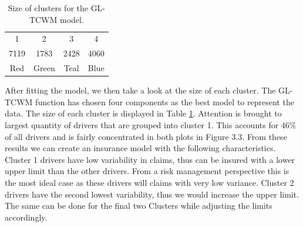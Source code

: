 \documentclass[11pt,letterpaper]{article}
\numberwithin{equation}{section}
\numberwithin{equation}{section}
\numberwithin{equation}{section}
\begin{document}
\begin{table}[!htb]
\centering
\caption{Size of clusters for the GL-TCWM model.}
\label{table:sizeSev}
\begin{tabular}{cccc}
\hline\hline
1   & 2  &  3   & 4    \\
7119 &1783& 2428& 4060 \\
Red & Green & Teal & Blue \\
\hline\hline
\end{tabular}
\end{table}

After fitting the model, we then take a look at the size of each cluster. The GL-TCWM function has chosen four components as the best model to represent the data. The size of each cluster is displayed in Table \ref{table:sizeSev}. Attention is brought to largest quantity  of drivers that are grouped into cluster 1. This accounts for $ 46 \% $ of all drivers and is fairly concentrated in both plots in Figure 3.3.
From these results we can create an insurance model with the following characteristics. Cluster 1 drivers have low variability in claims, thus can be insured with a lower upper limit than the other drivers. From a risk management perspective this is the most ideal case as these drivers will claims with very  low variance. Cluster 2 drivers have the second lowest variability, thus we would increase the upper limit. The same can be done for the final two Clusters while adjusting  the limits accordingly.
\begin{table}[!htb]
\centering
\caption{Summarized volatility information of each cluster.}
\label{table:volSev}
\end{table}
\end{document}
